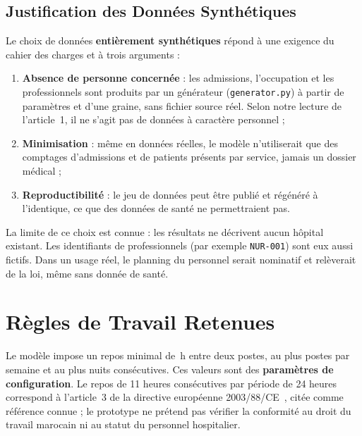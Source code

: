 \subsection{Justification des Données Synthétiques}
Le choix de données \textbf{entièrement synthétiques} répond à une exigence du cahier des charges et à trois arguments :
\begin{enumerate}
    \item \textbf{Absence de personne concernée} : les admissions, l'occupation et les professionnels sont produits par un générateur (\texttt{generator.py}) à partir de paramètres et d'une graine, sans fichier source réel. Selon notre lecture de l'article~1, il ne s'agit pas de données à caractère personnel ;
    \item \textbf{Minimisation} : même en données réelles, le modèle n'utiliserait que des comptages d'admissions et de patients présents par service, jamais un dossier médical ;
    \item \textbf{Reproductibilité} : le jeu de données peut être publié et régénéré à l'identique, ce que des données de santé ne permettraient pas.
\end{enumerate}

La limite de ce choix est connue : les résultats ne décrivent aucun hôpital existant. Les identifiants de professionnels (par exemple \texttt{NUR-001}) sont eux aussi fictifs. Dans un usage réel, le planning du personnel serait nominatif et relèverait de la loi, même sans donnée de santé.

\section{Règles de Travail Retenues}

Le modèle impose un repos minimal de \ReposMin{}\,h entre deux postes, au plus \PostesMax{} postes par semaine et au plus \NuitsMax{} nuits consécutives. Ces valeurs sont des \textbf{paramètres de configuration}. Le repos de 11 heures consécutives par période de 24 heures correspond à l'article~3 de la directive européenne 2003/88/CE~\cite{directive2003}, citée comme référence connue ; le prototype ne prétend pas vérifier la conformité au droit du travail marocain ni au statut du personnel hospitalier.


